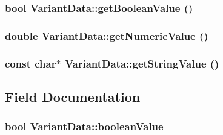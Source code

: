 \hypertarget{classVariantData_d6438333334172e261c0a76c8bbc325d}{
\subsubsection[{getBooleanValue}]{\setlength{\rightskip}{0pt plus 5cm}bool VariantData::getBooleanValue ()}}
\label{classVariantData_d6438333334172e261c0a76c8bbc325d}


\hypertarget{classVariantData_8ff14068dcf97d44f0cb73fe36fb90be}{
\subsubsection[{getNumericValue}]{\setlength{\rightskip}{0pt plus 5cm}double VariantData::getNumericValue ()}}
\label{classVariantData_8ff14068dcf97d44f0cb73fe36fb90be}


\hypertarget{classVariantData_bbf9e6d4a64cf875d3d16a51d2e9fb2f}{
\subsubsection[{getStringValue}]{\setlength{\rightskip}{0pt plus 5cm}const char$\ast$ VariantData::getStringValue ()}}
\label{classVariantData_bbf9e6d4a64cf875d3d16a51d2e9fb2f}




\subsection{Field Documentation}
\hypertarget{classVariantData_b89d01eddb1623a19a762816f8ecbe1b}{
\subsubsection[{booleanValue}]{\setlength{\rightskip}{0pt plus 5cm}bool {\bf VariantData::booleanValue}}}
\label{classVariantData_b89d01eddb1623a19a762816f8ecbe1b}


